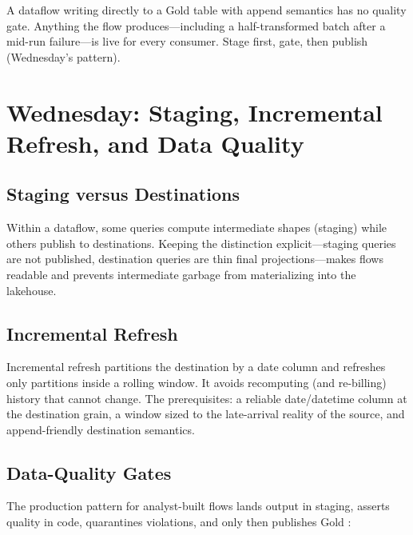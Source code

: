\begin{pitfall}
A dataflow writing directly to a Gold table with append semantics has no quality gate. Anything the flow produces---including a half-transformed batch after a mid-run failure---is live for every consumer. Stage first, gate, then publish (Wednesday's pattern).
\end{pitfall}

\section{Wednesday: Staging, Incremental Refresh, and Data Quality}
\subsection{Staging versus Destinations}
Within a dataflow, some queries compute intermediate shapes (staging) while others publish to destinations. Keeping the distinction explicit---staging queries are not published, destination queries are thin final projections---makes flows readable and prevents intermediate garbage from materializing into the lakehouse.

\subsection{Incremental Refresh}
Incremental refresh partitions the destination by a date column and refreshes only partitions inside a rolling window. It avoids recomputing (and re-billing) history that cannot change. The prerequisites: a reliable date/datetime column at the destination grain, a window sized to the late-arrival reality of the source, and append-friendly destination semantics.

\subsection{Data-Quality Gates}
The production pattern for analyst-built flows lands output in staging, asserts quality in code, quarantines violations, and only then publishes Gold \cite{microsoftFabricDataflows,greatExpectations}:

